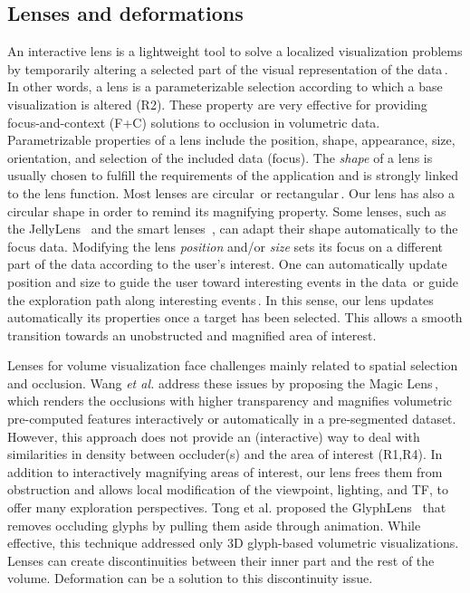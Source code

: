 \vspace{-0.15cm}
\subsection{Lenses and deformations}
%
An interactive lens is a lightweight tool to solve a localized visualization problems by temporarily altering a selected part of the visual representation of the data\,\cite{CGF:CGF12871}. In other words, a lens is a parameterizable selection according to which a base visualization is altered (R2). These property are very effective for providing focus-and-context (F+C) solutions to occlusion in volumetric data. Parametrizable properties of a lens include the position, shape, appearance, size, orientation, and selection of the included data (focus). The \emph{shape} of a lens is usually chosen to fulfill the requirements of the application and is strongly linked to the lens function. Most lenses are circular\,\cite{1648236} or rectangular\,\cite{Kincaid:2010:SFA:1907651.1907963}. Our lens has also a circular shape in order to remind its magnifying property. Some lenses, such as the JellyLens~\cite{Pindat:2012:JCA:2380116.2380150} and the smart lenses~\cite{Thiede2008}, can adapt their shape automatically to the focus data. Modifying the lens \emph{position} and/or \emph{size} sets its focus on a different part of the data according to the user's interest. One can automatically update position and size to guide the user toward interesting events in the data\,\cite{Tominski:2011:ECU:2336207.2336211} or guide the exploration path along interesting events\,\cite{Alvina:2014:RER:2598153.2598200}. In this sense, our lens updates automatically its properties once a target has been selected. This allows a smooth transition towards an unobstructed and magnified area of interest.

Lenses for volume visualization face challenges mainly related to spatial selection and occlusion. Wang \emph{et al.} address these issues by proposing the Magic Lens\,\cite{1532818}, which renders the occlusions with higher transparency and magnifies volumetric pre-computed features interactively or automatically in a pre-segmented dataset. However, this approach does not provide an (interactive) way to deal with similarities in density between occluder(s) and the area of interest (R1,R4). In addition to interactively magnifying areas of interest, our lens frees them from obstruction and allows local modification of the viewpoint, lighting, and TF, to offer many exploration perspectives. Tong et al. proposed the GlyphLens~\cite{7539643} that removes occluding glyphs by pulling them aside through animation. While effective, this technique addressed only 3D glyph-based volumetric visualizations. Lenses can create discontinuities between their inner part and the rest of the volume. Deformation can be a solution to this discontinuity issue.


